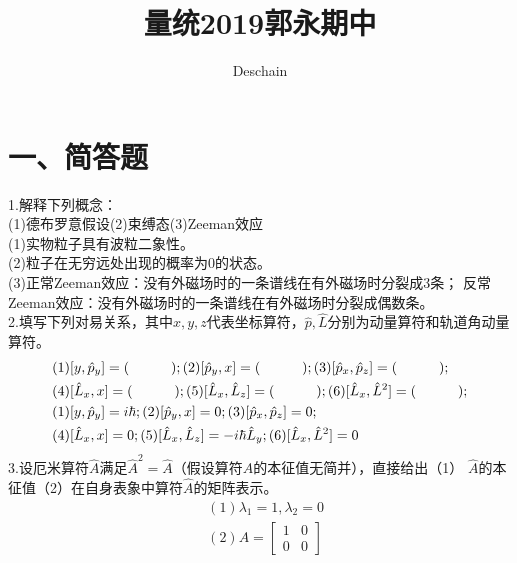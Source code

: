 \documentclass[UTF8]{ctexart}
\title{量统2019郭永期中}
\author{Deschain}
\begin{document}
\maketitle
\section*{一、简答题}
1.解释下列概念：\\
(1)德布罗意假设(2)束缚态(3)Zeeman效应\\
(1)实物粒子具有波粒二象性。\\
(2)粒子在无穷远处出现的概率为0的状态。\\
(3)正常Zeeman效应：没有外磁场时的一条谱线在有外磁场时分裂成3条；
反常Zeeman效应：没有外磁场时的一条谱线在有外磁场时分裂成偶数条。\\
2.填写下列对易关系，其中$x,y,z$代表坐标算符，$\hat p,\hat L$分别为动量算符和轨道角动量算符。\\
\begin{equation*}
  \begin{aligned}
     & (1)[y,\hat p_y]=(\quad\quad\quad);(2)[\hat p_y,x]=(\quad\quad\quad);
    (3)[\hat p_x,\hat p_z]=(\quad\quad\quad);                                            \\
     & (4)[\hat L_x,x]=(\quad\quad\quad);(5)[\hat L_x,\hat L_z]=(\quad\quad\quad);
    (6)[\hat L_x,\hat L^2]=(\quad\quad\quad);                                            \\
    \newline
     & (1)[y,\hat p_y]=i\hbar;(2)[\hat p_y,x]=0;(3)[\hat p_x,\hat p_z]=0;                \\
     & (4)[\hat L_x,x]=0;(5)[\hat L_x,\hat L_z]=-i\hbar\hat L_y;(6)[\hat L_x,\hat L^2]=0 \\
  \end{aligned}
\end{equation*}
3.设厄米算符$\hat A$满足$\hat A^2=\hat A$（假设算符$\hat A$的本征值无简并），直接给出（1）
$\hat A$的本征值（2）在自身表象中算符$\hat A$的矩阵表示。\\
\begin{equation*}
  \begin{aligned}
     & (1)\lambda_1=1,\lambda_2=0     \\
     & (2)A=\begin{bmatrix}
      1 & 0 \\
      0 & 0
    \end{bmatrix}
  \end{aligned}
\end{equation*}
\end{document}
